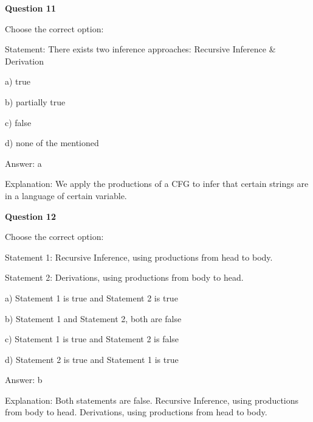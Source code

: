 \documentclass{article}
\begin{document}
\begin{mdframed}[linewidth=1pt, roundcorner=5pt, linecolor=gray!30, backgroundcolor=gray!5]
\textbf{Question 11} 

Choose the correct option:

Statement: There exists two inference approaches: Recursive Inference \& Derivation

a) true

b) partially true

c) false

d) none of the mentioned
\vspace{5pt} \par
\begin{tcolorbox}[colback=green!5, colframe=green!40!black, title=Solution]
Answer: a

Explanation: We apply the productions of a CFG to infer that certain strings are in a language of certain variable.
\end{tcolorbox}
\end{mdframed}

\begin{mdframed}[linewidth=1pt, roundcorner=5pt, linecolor=gray!30, backgroundcolor=gray!5]
\textbf{Question 12} 

Choose the correct option:

Statement 1: Recursive Inference, using productions from head to body.

Statement 2: Derivations, using productions from body to head.

a) Statement 1 is true and Statement 2 is true

b) Statement 1 and Statement 2, both are false

c) Statement 1 is true and Statement 2 is false

d) Statement 2 is true and Statement 1 is true
\vspace{5pt} \par
\begin{tcolorbox}[colback=green!5, colframe=green!40!black, title=Solution]
Answer: b

Explanation: Both statements are false. Recursive Inference, using productions from body to head. Derivations, using productions from head to body.
\end{tcolorbox}
\end{mdframed}
\newpage
\end{document}
